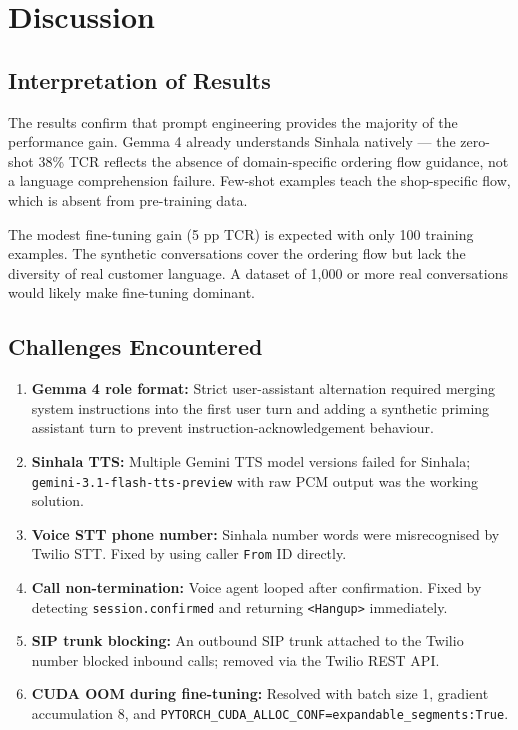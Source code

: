 \documentclass[12pt,a4paper]{report}
\begin{document}
\chapter{Discussion}

\section{Interpretation of Results}
The results confirm that prompt engineering provides the majority of the performance gain. Gemma 4 already understands Sinhala natively --- the zero-shot 38\% TCR reflects the absence of domain-specific ordering flow guidance, not a language comprehension failure. Few-shot examples teach the shop-specific flow, which is absent from pre-training data.

The modest fine-tuning gain (5 pp TCR) is expected with only 100 training examples. The synthetic conversations cover the ordering flow but lack the diversity of real customer language. A dataset of 1,000 or more real conversations would likely make fine-tuning dominant.

\section{Challenges Encountered}
\begin{enumerate}
    \item \textbf{Gemma 4 role format:} Strict user-assistant alternation required merging system instructions into the first user turn and adding a synthetic priming assistant turn to prevent instruction-acknowledgement behaviour.
    \item \textbf{Sinhala TTS:} Multiple Gemini TTS model versions failed for Sinhala; \texttt{gemini-3.1-flash-tts-preview} with raw PCM output was the working solution.
    \item \textbf{Voice STT phone number:} Sinhala number words were misrecognised by Twilio STT. Fixed by using caller \texttt{From} ID directly.
    \item \textbf{Call non-termination:} Voice agent looped after confirmation. Fixed by detecting \texttt{session.confirmed} and returning \texttt{<Hangup>} immediately.
    \item \textbf{SIP trunk blocking:} An outbound SIP trunk attached to the Twilio number blocked inbound calls; removed via the Twilio REST API.
    \item \textbf{CUDA OOM during fine-tuning:} Resolved with batch size 1, gradient accumulation 8, and \texttt{PYTORCH\_CUDA\_ALLOC\_CONF=expandable\_segments:True}.
\end{enumerate}
\end{document}
